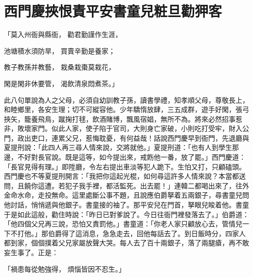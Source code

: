 %

\chapter{西門慶挾恨責平安\KG 書童兒粧旦勸狎客}


「莫入州衙與縣衙，  勸君勤謹作生涯，

池塘積水須防旱，  買賣辛勤是養家；

教子教孫并教藝，  栽桑栽棗莫栽花，

閑是閑非休要管，  渴飲清泉悶煮茶。」

此八句單說為人之父母，必須自幼訓教子孫，讀書學禮，知孝順父母，尊敬長上，和睦鄉里，各安生理；切不可縱容他。少年驕惰放肆，三五成群，遊手好閑，張弓挾矢，籠養飛鳥，蹴掬打毬，飲酒賭博，飄風宿娼，無所不為。將來必然招事惹非，敗壞家門。似此人家，使子陷于官司，大則身亡家破，小則吃打受牢，財入公門，政出吏口，連累父兄，惹悔耽憂，有何益哉！話說西門慶早到衙門，先退廳與夏提刑說：「此四人再三尋人情來說，交將就他。」夏提刑道：「也有人到學生那邊，不好對長官說。既是這等，如今提出來，戒飭他一番，放了罷。」西門慶道：「長官見得有理。」即陞廳，令左右提出車淡等犯人跪下。生怕又打，只顧磕頭。西門慶也不等夏提刑開言：「我把你這起光棍，如何尋這許多人情來說？本當都送問，且饒你這遭。若犯子我手裡，都活監死。出去罷！」連韓二都喝出來了，往外金命水命，走投無命。這里處斷公事不題，且說應伯爵拏着五兩銀子，尋書童兒問他討話，悄悄遞與他銀子。書童接的袖了。那平安兒在門首，拏眼兒睃着他。書童于是如此這般，勸住時說：「昨日已對爹說了。今日往衙門裡發落去了。」伯爵道：「他四個父兄再三說，恐怕又責罰他。」書童道：「你老人家只顧放心去，管情兒一下不打他。」那伯爵得了這消息，急急走去，回他每話去了。到日飯時分，四家人都到家，個個撲着父兄家屬放聲大哭。每人去了百十兩銀子，落了兩腿瘡，再不敢妄生事了。正是：

「禍患每從勉強得，  煩惱皆因不忍生。」

